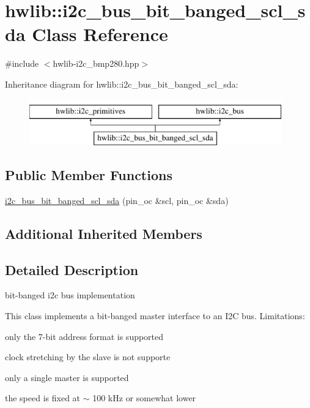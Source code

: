 \hypertarget{classhwlib_1_1i2c__bus__bit__banged__scl__sda}{}\section{hwlib\+::i2c\+\_\+bus\+\_\+bit\+\_\+banged\+\_\+scl\+\_\+sda Class Reference}
\label{classhwlib_1_1i2c__bus__bit__banged__scl__sda}


{\ttfamily \#include $<$hwlib-\/i2c\+\_\+bmp280.\+hpp$>$}

Inheritance diagram for hwlib\+::i2c\+\_\+bus\+\_\+bit\+\_\+banged\+\_\+scl\+\_\+sda\+:\begin{figure}[H]
\begin{center}
\leavevmode
\includegraphics[height=2.000000cm]{classhwlib_1_1i2c__bus__bit__banged__scl__sda}
\end{center}
\end{figure}
\subsection*{Public Member Functions}
\begin{DoxyCompactItemize}
\item 
\mbox{\hyperlink{classhwlib_1_1i2c__bus__bit__banged__scl__sda_aff6b11113640da8c8f04b60081bef5ae}{i2c\+\_\+bus\+\_\+bit\+\_\+banged\+\_\+scl\+\_\+sda}} (pin\+\_\+oc \&scl, pin\+\_\+oc \&sda)
\end{DoxyCompactItemize}
\subsection*{Additional Inherited Members}


\subsection{Detailed Description}
bit-\/banged i2c bus implementation

This class implements a bit-\/banged master interface to an I2C bus. Limitations\+:
\begin{DoxyItemize}
\item only the 7-\/bit address format is supported
\item clock stretching by the slave is not supporte
\item only a single master is supported
\item the speed is fixed at $\sim$ 100 k\+Hz or somewhat lower 
\end{DoxyItemize}

